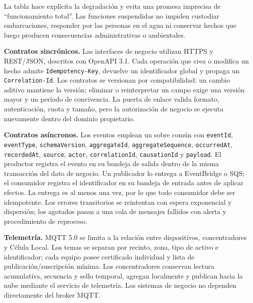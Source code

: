 La tabla hace explícita la degradación y evita una promesa imprecisa de “funcionamiento total”. Las funciones suspendidas no impiden custodiar embarcaciones, responder por las personas en el agua ni conservar hechos que luego producen consecuencias administrativas o ambientales.

\textbf{Contratos sincrónicos.} Las interfaces de negocio utilizan HTTPS y REST/JSON, descritos con OpenAPI 3.1. Cada operación que crea o modifica un hecho admite \texttt{Idempotency-Key}, devuelve un identificador global y propaga un \texttt{Correlation-Id}. Los contratos se versionan por compatibilidad: un cambio aditivo mantiene la versión; eliminar o reinterpretar un campo exige una versión mayor y un período de convivencia. La puerta de enlace valida formato, autenticación, cuota y tamaño, pero la autorización de negocio se ejecuta nuevamente dentro del dominio propietario.

\begin{sloppypar}
\textbf{Contratos asíncronos.} Los eventos emplean un sobre común con \texttt{eventId}, \texttt{eventType}, \texttt{schemaVersion}, \texttt{aggregateId}, \texttt{aggregateSequence}, \texttt{occurredAt}, \texttt{recordedAt}, \texttt{source}, \texttt{actor}, \texttt{correlationId}, \texttt{causationId} y \texttt{payload}. El productor registra el evento en su bandeja de salida dentro de la misma transacción del dato de negocio. Un publicador lo entrega a EventBridge o SQS; el consumidor registra el identificador en su bandeja de entrada antes de aplicar efectos. La entrega es al menos una vez, por lo que todo consumidor debe ser idempotente. Los errores transitorios se reintentan con espera exponencial y dispersión; los agotados pasan a una cola de mensajes fallidos con alerta y procedimiento de reproceso.
\end{sloppypar}





\textbf{Telemetría.} MQTT 5.0 se limita a la relación entre dispositivos, concentradores y Célula Local. Los temas se separan por recinto, zona, tipo de activo e identificador; cada equipo posee certificado individual y lista de publicación/suscripción mínima. Los concentradores conservan lectura acumulativa, secuencia y sello temporal, agregan localmente y publican hacia la nube mediante el servicio de telemetría. Los sistemas de negocio no dependen directamente del broker MQTT.

